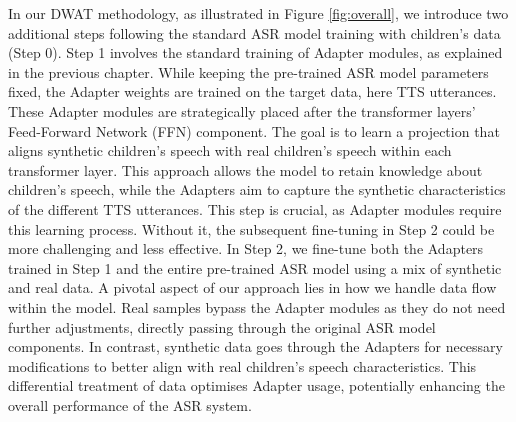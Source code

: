 In our DWAT  methodology, as illustrated in Figure \ref{fig:overall}, we introduce two additional steps following the standard ASR model training with children's data (Step 0).
Step 1 involves the standard training of Adapter modules, as explained in the previous chapter. While keeping the pre-trained ASR model parameters fixed, the Adapter weights are trained on the target data, here TTS utterances. These Adapter modules are strategically placed after the transformer layers' Feed-Forward Network (FFN) component. The goal is to learn a projection that aligns synthetic children's speech with real children's speech within each transformer layer. This approach allows the model to retain knowledge about children's speech, while the Adapters aim to capture the synthetic characteristics of the different TTS utterances. This step is crucial, as Adapter modules require this learning process. Without it, the subsequent fine-tuning in Step 2 could be more challenging and less effective.
In Step 2, we fine-tune both the Adapters trained in Step 1 and the entire pre-trained ASR model using a mix of synthetic and real data. A pivotal aspect of our approach lies in how we handle data flow within the model. Real samples bypass the Adapter modules as they do not need further adjustments, directly passing through the original ASR model components. In contrast, synthetic data goes through the Adapters for necessary modifications to better align with real children's speech characteristics. This differential treatment of data optimises Adapter usage, potentially enhancing the overall performance of the ASR system.
